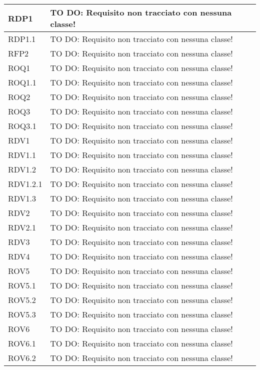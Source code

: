 \begin{center}
\begin{longtable}{| p{2.5cm} | p{11cm} |}
\hline
RDP1 & TO DO: Requisito non tracciato con nessuna classe! \\
\hline
RDP1.1 & TO DO: Requisito non tracciato con nessuna classe! \\
\hline
RFP2 & TO DO: Requisito non tracciato con nessuna classe! \\
\hline
ROQ1 & TO DO: Requisito non tracciato con nessuna classe! \\
\hline
ROQ1.1 & TO DO: Requisito non tracciato con nessuna classe! \\
\hline
ROQ2 & TO DO: Requisito non tracciato con nessuna classe! \\
\hline
ROQ3 & TO DO: Requisito non tracciato con nessuna classe! \\
\hline
ROQ3.1 & TO DO: Requisito non tracciato con nessuna classe! \\
\hline
RDV1 & TO DO: Requisito non tracciato con nessuna classe! \\
\hline
RDV1.1 & TO DO: Requisito non tracciato con nessuna classe! \\
\hline
RDV1.2 & TO DO: Requisito non tracciato con nessuna classe! \\
\hline
RDV1.2.1 & TO DO: Requisito non tracciato con nessuna classe! \\
\hline
RDV1.3 & TO DO: Requisito non tracciato con nessuna classe! \\
\hline
RDV2 & TO DO: Requisito non tracciato con nessuna classe! \\
\hline
RDV2.1 & TO DO: Requisito non tracciato con nessuna classe! \\
\hline
RDV3 & TO DO: Requisito non tracciato con nessuna classe! \\
\hline
RDV4 & TO DO: Requisito non tracciato con nessuna classe! \\
\hline
ROV5 & TO DO: Requisito non tracciato con nessuna classe! \\
\hline
ROV5.1 & TO DO: Requisito non tracciato con nessuna classe! \\
\hline
ROV5.2 & TO DO: Requisito non tracciato con nessuna classe! \\
\hline
ROV5.3 & TO DO: Requisito non tracciato con nessuna classe! \\
\hline
ROV6 & TO DO: Requisito non tracciato con nessuna classe! \\
\hline
ROV6.1 & TO DO: Requisito non tracciato con nessuna classe! \\
\hline
ROV6.2 & TO DO: Requisito non tracciato con nessuna classe! \\

\end{longtable}
\end{center}
